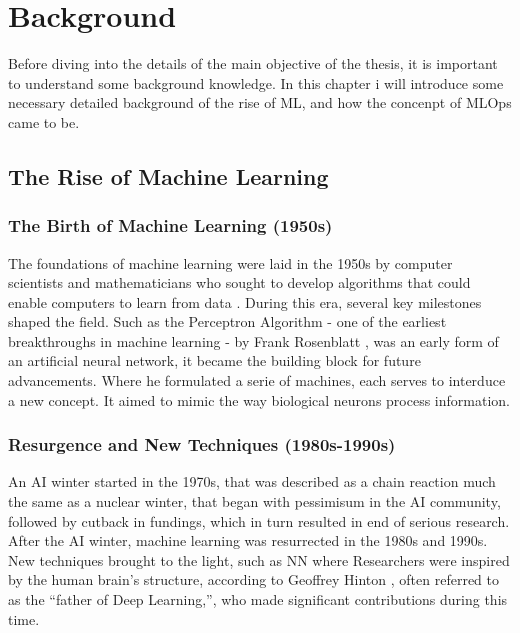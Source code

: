 \chapter{Background}\label{chapter:background}

Before diving into the details of the main objective of the thesis, it is important to understand some background knowledge. In this chapter i will introduce some necessary detailed background of the rise of \ac{ML}, and how the concenpt of \ac{MLOps} came to be.

\section{The Rise of Machine Learning}
\subsection{The Birth of Machine Learning (1950s)}
The foundations of machine learning were laid in the 1950s by computer scientists and mathematicians who sought to develop algorithms that could enable computers to learn from data \cite{MLHistory, Rahal2024, MLRise}. During this era, several key milestones shaped the field. Such as the Perceptron Algorithm - one of the earliest breakthroughs in machine learning - by Frank Rosenblatt \cite{Frank_Rosenblatt},  was an early form of an artificial neural network, it became the building block for future advancements.
Where he formulated a serie of machines, each serves to interduce a new concept. It aimed to mimic the way biological neurons process information.

\subsection{Resurgence and New Techniques (1980s-1990s)}
An \ac{AI} winter started in the 1970s, that was described as a chain reaction much the same as a nuclear winter, that began with pessimisum in the \ac{AI} community, followed by cutback in fundings, which in turn resulted in end of serious research. After the \ac{AI} winter, machine learning was resurrected in the 1980s and 1990s. New techniques brought to the light, such as
\ac{NN} where Researchers were inspired by the human brain’s structure, according to Geoffrey Hinton \cite{Geoffrey_Hinton}
, often referred to as the “father of Deep Learning,”, who made significant contributions during this time.

